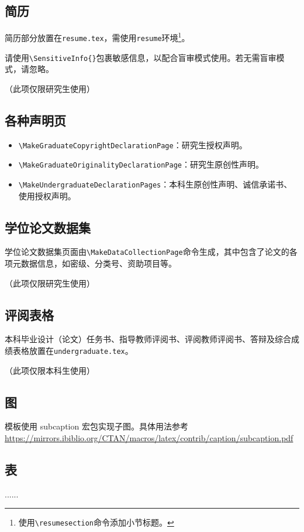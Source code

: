 \subsection{简历}
简历部分放置在\texttt{resume.tex}，需使用\texttt{resume}环境\footnote{使用\texttt{\textbackslash resumesection{}}命令添加小节标题。}。

请使用\verb|\SensitiveInfo{}|包裹敏感信息，以配合盲审模式使用。若无需盲审模式，请忽略。

（此项仅限研究生使用）

\subsection{各种声明页}
\begin{itemize}[itemsep=2pt,topsep=5pt]
  \sloppy
  \item \verb|\MakeGraduateCopyrightDeclarationPage|：研究生授权声明。
  \item \verb|\MakeGraduateOriginalityDeclarationPage|：研究生原创性声明。
  \item \verb|\MakeUndergraduateDeclarationPages|：本科生原创性声明、诚信承诺书、使用授权声明。 
\end{itemize}

\subsection{学位论文数据集}
学位论文数据集页面由\verb|\MakeDataCollectionPage|命令生成，其中包含了论文的各项元数据信息，如密级、分类号、资助项目等。

（此项仅限研究生使用）

\subsection{评阅表格}
本科毕业设计（论文）任务书、指导教师评阅书、评阅教师评阅书、答辩及综合成绩表格放置在\texttt{undergraduate.tex}。

（此项仅限本科生使用）

\subsection{图}
模板使用 \textsf{subcaption} 宏包实现子图。具体用法参考\url{https://mirrors.ibiblio.org/CTAN/macros/latex/contrib/caption/subcaption.pdf}

\subsection{表}
......

